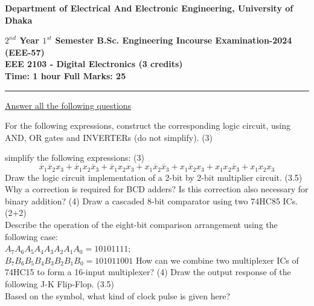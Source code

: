 \documentclass[a4paper,11pt]{exam}
\begin{document}
\newpage
\begin{center}
    \begin{large}
        {\textbf{
            Department of Electrical And Electronic Engineering, University of Dhaka \\
        }}
    \end{large}
    \textbf{$2^{nd}$ Year $1^{st}$ Semester B.Sc. Engineering Incourse Examination-2024 (EEE-57) \\
        EEE 2103 - Digital Electronics (3 credits) \\
        Time: 1 hour \hfill Full Marks: 25}
    \noindent\rule{\linewidth}{1.2pt}
\end{center}
\underline{Answer all the following questions}
\begin{questions}
    \question For the following expressions, construct the corresponding logic circuit, using AND, OR gates and INVERTERs (do not simplify). \hfill (3)
    \question simplify the following expressions: \hfill (3)
    $$\overline{x}_1\overline{x}_2x_3+\overline{x}_1x_2\overline{x}_3+\overline{x}_1x_2x_3+x_1\overline{x}_2\overline{x}_3 + x_1\overline{x}_2x_3+x_1x_2\overline{x}_3+x_1x_2x_3$$
    \question Draw the logic circuit implementation of a 2-bit by 2-bit multiplier circuit. \hfill(3.5)
    \question Why a correction is required for BCD adders? Is this correction also necessary for binary addition? \hfill (4)
    \question Draw a cascaded 8-bit comparator using two 74HC85 ICs. \hfill (2+2) \\
    Describe the operation of the eight-bit comparison arrangement using the following case: \\
    $A_7A_6A_5A_4A_3A_2A_1A_0 = 10101111;$ \\ 
    $B_7B_6B_5B_4B_3B_2B_1B_0 = 101011001$
    \question How can we combine two multiplexer ICs of 74HC15 to form a 16-input multiplexer? \hfill (4)
    \question Draw the output response of the following J-K Flip-Flop. \hfill (3.5) \\
    Based on the symbol, what kind of clock pulse is given here?  
\end{questions}
\end{document}
